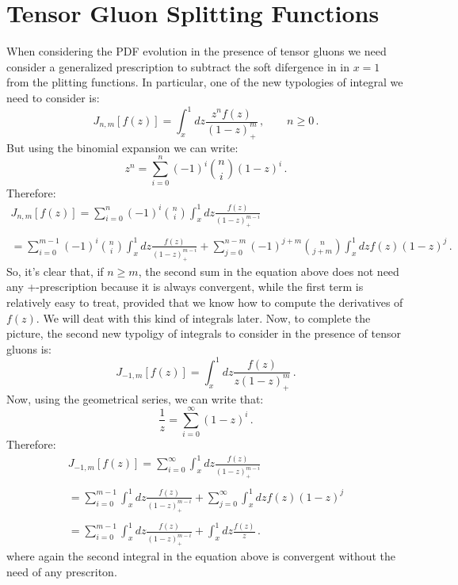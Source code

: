 \documentclass[10pt,a4paper]{article}
\begin{document}
\section{Tensor Gluon Splitting Functions}

When considering the PDF evolution in the presence of tensor gluons we
need consider a generalized prescription to subtract the soft
difergence in in $x=1$ from the plitting functions. In particular, one
of the new typologies of integral we need to consider is:
\begin{equation}
J_{n,m}[f(z)]=\int_x^1 dz\frac{z^nf(z)}{(1-z)_+^m}\,,\qquad n\geq 0\,.
\end{equation}
But using the binomial expansion we can write:
\begin{equation}
z^n = \sum_{i=0}^n (-1)^i {n \choose i} (1-z)^i\,.
\end{equation}
Therefore:
\begin{equation}\label{Jnmfz}
\begin{array}{c}
\displaystyle J_{n,m}[f(z)]=\sum_{i=0}^n (-1)^i {n \choose i} \int_x^1
dz\frac{f(z)}{(1-z)_+^{m-i}}\\
\\
\displaystyle = \sum_{i=0}^{m-1} (-1)^i {n \choose i} \int_x^1
dz\frac{f(z)}{(1-z)_+^{m-i}} + \sum_{j=0}^{n-m}(-1)^{j+m}{n \choose j+m}\int_x^1dzf(z)(1-z)^j\,.
\end{array}
\end{equation}
So, it's clear that, if $n\geq m$, the second sum in the equation
above does not need any +-prescription because it is always
convergent, while the first term is relatively easy to treat, provided
that we know how to compute the derivatives of $f(z)$. We will deat
with this kind of integrals later. Now, to complete the picture, the
second new typoligy of integrals to consider in the presence of tensor
gluons is:
\begin{equation}
J_{-1,m}[f(z)]=\int_x^1 dz\frac{f(z)}{z(1-z)_+^m}\,.
\end{equation}
Now, using the geometrical series, we can write that:
\begin{equation}
\frac1z = \sum_{i=0}^\infty (1-z)^i\,.
\end{equation}
Therefore:
\begin{equation}\label{Jm1mfz}
\begin{array}{c}
\displaystyle J_{-1,m}[f(z)]=\sum_{i=0}^\infty \int_x^1
dz\frac{f(z)}{(1-z)_+^{m-i}}\\
\\
\displaystyle = \sum_{i=0}^{m-1} \int_x^1
dz\frac{f(z)}{(1-z)_+^{m-i}} +
\sum_{j=0}^{\infty}\int_x^1dzf(z)(1-z)^j\\
\\
\displaystyle = \sum_{i=0}^{m-1} \int_x^1
dz\frac{f(z)}{(1-z)_+^{m-i}} +
\int_x^1dz\frac{f(z)}{z}\,.
\end{array}
\end{equation}
where again the second integral in the equation above is convergent
without the need of any prescriton.
\end{document}
